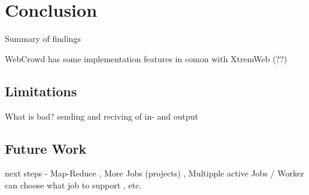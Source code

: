 \chapter{Conclusion}
\label{ch:conclusion}
Summary of findings

WebCrowd has some implementation features in comon with XtremWeb (??)

\section{Limitations}
\label{sec:conclusion:limitations}
What is bad? sending and reciving of in- and output

\section{Future Work}
\label{sec:conclusion:future_work}
next steps - Map-Reduce , More Jobs (projects) , Multipple active Jobs / Worker can choose what job to support , etc.
